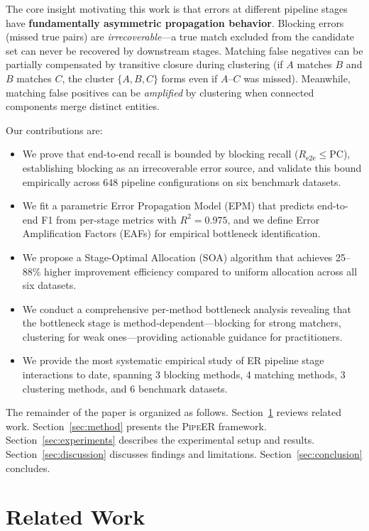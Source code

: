 \documentclass{article}
\newcommand{\PC}{\mathrm{PC}}
\newcommand{\Ree}{R_{\mathrm{e2e}}}
\newcommand{\PipeER}{\textsc{PipeER}}
\begin{document}
The core insight motivating this work is that errors at different pipeline stages have \textbf{fundamentally asymmetric propagation behavior}.
Blocking errors (missed true pairs) are \emph{irrecoverable}---a true match excluded from the candidate set can never be recovered by downstream stages.
Matching false negatives can be partially compensated by transitive closure during clustering (if $A$ matches $B$ and $B$ matches $C$, the cluster $\{A,B,C\}$ forms even if $A$--$C$ was missed).
Meanwhile, matching false positives can be \emph{amplified} by clustering when connected components merge distinct entities.

Our contributions are:
\begin{itemize}
    \item We prove that end-to-end recall is bounded by blocking recall ($\Ree \leq \PC$), establishing blocking as an irrecoverable error source, and validate this bound empirically across 648 pipeline configurations on six benchmark datasets.
    \item We fit a parametric Error Propagation Model (EPM) that predicts end-to-end F1 from per-stage metrics with $R^2 = 0.975$, and we define Error Amplification Factors (EAFs) for empirical bottleneck identification.
    \item We propose a Stage-Optimal Allocation (SOA) algorithm that achieves 25--88\% higher improvement efficiency compared to uniform allocation across all six datasets.
    \item We conduct a comprehensive per-method bottleneck analysis revealing that the bottleneck stage is method-dependent---blocking for strong matchers, clustering for weak ones---providing actionable guidance for practitioners.
    \item We provide the most systematic empirical study of ER pipeline stage interactions to date, spanning 3 blocking methods, 4 matching methods, 3 clustering methods, and 6 benchmark datasets.
\end{itemize}

The remainder of the paper is organized as follows.
Section~\ref{sec:related} reviews related work.
Section~\ref{sec:method} presents the \PipeER{} framework.
Section~\ref{sec:experiments} describes the experimental setup and results.
Section~\ref{sec:discussion} discusses findings and limitations.
Section~\ref{sec:conclusion} concludes.

\section{Related Work}
\label{sec:related}
\end{document}

